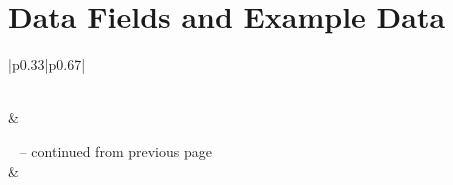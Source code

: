 \chapter{Data Fields and Example Data}

\begin{longtable}{|p{}|p{}|}
	\toprule\noalign{}
	\caption{Fields of Projects}
	\label{tab:appendix-fields-meaning}                                                                      \\

	\hline
	 &                              \\
	\hline
	\endfirsthead

	{{\tablename\ \thetable{} -- continued from previous page}}                                              \\
	\hline
	 &                              \\
	\hline
	\endhead

	\hline
	                                                           \\ \hline
	\endfoot

	\hline \hline
	\endlastfoot


\end{longtable}
